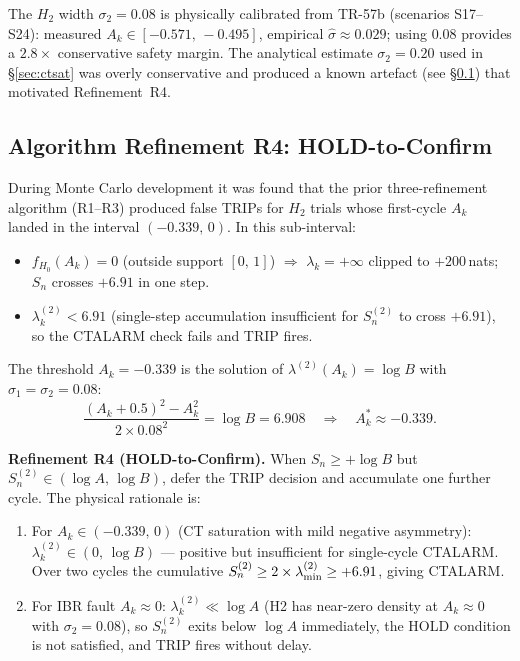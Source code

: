 \documentclass[11pt, a4paper]{article}
\begin{document}
The $H_2$ width $\sigma_2 = 0.08$ is physically calibrated from
TR-57b (scenarios S17–S24): measured $A_k \in [-0.571,\,-0.495]$,
empirical $\hat{\sigma} \approx 0.029$; using $0.08$ provides a $2.8\times$
conservative safety margin.  The analytical estimate $\sigma_2 = 0.20$
used in §\ref{sec:ctsat} was overly conservative and produced a
known artefact (see §\ref{sec:tr57c_r4}) that motivated Refinement~R4.

\subsection{Algorithm Refinement R4: HOLD-to-Confirm}
\label{sec:tr57c_r4}

During Monte Carlo development it was found that the prior three-refinement
algorithm (R1–R3) produced false TRIPs for $H_2$ trials whose first-cycle
$A_k$ landed in the interval $(-0.339,\,0)$.  In this sub-interval:

\begin{itemize}
  \item $f_{H_0}(A_k) = 0$ (outside support $[0,\,1]$) $\Rightarrow$
    $\lambda_k = +\infty$ clipped to $+200\,$nats; $S_n$ crosses $+6.91$
    in one step.
  \item $\lambda^{(2)}_k < 6.91$ (single-step accumulation insufficient
    for $S^{(2)}_n$ to cross $+6.91$), so the CTALARM check fails and
    TRIP fires.
\end{itemize}

The threshold $A_k = -0.339$ is the solution of
$\lambda^{(2)}(A_k) = \log B$ with $\sigma_1 = \sigma_2 = 0.08$:
\begin{equation}
  \frac{(A_k + 0.5)^2 - A_k^2}{2 \times 0.08^2} = \log B = 6.908
  \quad\Rightarrow\quad
  A_k^* \approx -0.339.
\end{equation}

\textbf{Refinement R4 (HOLD-to-Confirm).}  When $S_n \geq +\log B$ but
$S^{(2)}_n \in (\log A,\,\log B)$, defer the TRIP decision and accumulate
one further cycle.  The physical rationale is:
\begin{enumerate}
  \item For $A_k \in (-0.339,\,0)$ (CT saturation with mild negative
    asymmetry): $\lambda^{(2)}_k \in (0,\,\log B)$ — positive but
    insufficient for single-cycle CTALARM.  Over two cycles the
    cumulative $S^{(2)}_n \geq 2 \times \lambda^{(2)}_{\rm min} \geq +6.91$,
    giving CTALARM. \\
  \item For IBR fault $A_k \approx 0$: $\lambda^{(2)}_k \ll \log A$ (H2
    has near-zero density at $A_k \approx 0$ with $\sigma_2 = 0.08$),
    so $S^{(2)}_n$ exits below $\log A$ immediately, the HOLD condition is
    not satisfied, and TRIP fires without delay.
\end{enumerate}
\end{document}
